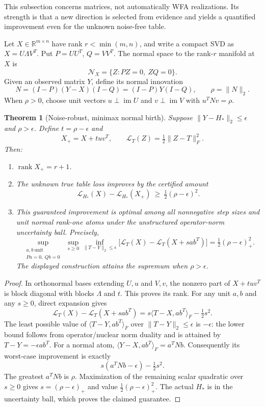 \documentclass[11pt]{article}
\newtheorem{theorem}{Theorem}[section]
\theoremstyle{definition}
\theoremstyle{remark}
\begin{document}
This subsection concerns matrices, not automatically WFA realizations. Its
strength is that a new direction is selected from evidence and yields a
quantified improvement even for the unknown noise-free table.

Let $X\in\mathbb R^{m\times n}$ have rank $r<\min(m,n)$, and write a
compact SVD as $X=U\Lambda V^T$. Put $P=UU^T$, $Q=VV^T$. The normal
space to the rank-$r$ manifold at $X$ is
\[
 \mathcal N_X=\{Z:PZ=0,\ ZQ=0\}.
\]
Given an observed matrix $Y$, define its normal innovation
\[
 N=(I-P)(Y-X)(I-Q)=(I-P)Y(I-Q),\qquad\rho=\|N\|_2.
\]
When $\rho>0$, choose unit vectors $u\perp\operatorname{im}U$ and
$v\perp\operatorname{im}V$ with $u^TNv=\rho$.

\begin{theorem}[Noise-robust, minimax normal birth]
\label{ce:robust-birth}
Suppose $\|Y-H_*\|_2\leq\epsilon$ and $\rho>\epsilon$. Define
$t=\rho-\epsilon$ and
\[
 X_+=X+tuv^T,\qquad
 \mathcal L_T(Z)=\tfrac12\|Z-T\|_F^2.
\]
Then:
\begin{enumerate}
\item $\operatorname{rank}X_+=r+1$.
\item The unknown true table loss improves by the certified amount
\[
 \mathcal L_{H_*}(X)-\mathcal L_{H_*}(X_+)
 \ \geq\ \tfrac12(\rho-\epsilon)^2.
\]
\item This guaranteed improvement is optimal among all nonnegative step
      sizes and unit normal rank-one atoms under the unstructured
      operator-norm uncertainty ball. Precisely,
\[
 \sup_{\substack{a,b\ {\mathrm{unit}}\\ Pa=0,\ Qb=0}}\ \sup_{s\geq0}
 \inf_{\|T-Y\|_2\leq\epsilon}
 \bigl[\mathcal L_T(X)-\mathcal L_T(X+sab^T)\bigr]
 =\tfrac12(\rho-\epsilon)_+^2.
\]
The displayed construction attains the supremum when $\rho>\epsilon$.
\end{enumerate}
\end{theorem}
\begin{proof}
In orthonormal bases extending $U,u$ and $V,v$, the nonzero part of
$X+tuv^T$ is block diagonal with blocks $\Lambda$ and $t$. This proves
its rank.
For any unit $a,b$ and any $s\geq0$, direct expansion gives
\[
 \mathcal L_T(X)-\mathcal L_T(X+sab^T)
 =s\langle T-X,ab^T\rangle_F-\tfrac12s^2.
\]
The least possible value of $\langle T-Y,ab^T\rangle_F$ over
$\|T-Y\|_2\leq\epsilon$ is $-\epsilon$: the lower bound follows from
operator/nuclear norm duality and is attained by
$T-Y=-\epsilon ab^T$. For a normal atom,
$\langle Y-X,ab^T\rangle_F=a^TNb$. Consequently its worst-case
improvement is exactly
\[
 s(a^TNb-\epsilon)-\tfrac12s^2.
\]
The greatest $a^TNb$ is $\rho$. Maximization of the remaining scalar
quadratic over $s\geq0$ gives $s=(\rho-\epsilon)_+$ and value
$\tfrac12(\rho-\epsilon)_+^2$. The actual $H_*$ is in the uncertainty
ball, which proves the claimed guarantee.
\end{proof}
\end{document}
